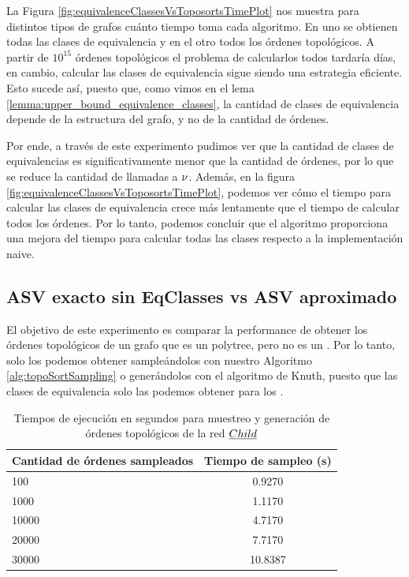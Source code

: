 La Figura \ref{fig:equivalenceClassesVsToposortsTimePlot} nos muestra para distintos tipos de grafos cuánto tiempo toma cada algoritmo. En uno se obtienen todas las clases de equivalencia y en el otro todos los órdenes topológicos. A partir de $10^{15}$ órdenes topológicos el problema de calcularlos todos tardaría días, en cambio, calcular las clases de equivalencia sigue siendo una estrategia eficiente. Esto sucede así, puesto que, como vimos en el lema \ref{lemma:upper_bound_equivalence_classes}, la cantidad de clases de equivalencia depende de la estructura del grafo, y no de la cantidad de órdenes.

Por ende, a través de este experimento pudimos ver que la cantidad de clases de equivalencias es significativamente menor que la cantidad de órdenes, por lo que se reduce la cantidad de llamadas a $\nu$. Además, en la figura \ref{fig:equivalenceClassesVsToposortsTimePlot}, podemos ver cómo el tiempo para calcular las clases de equivalencia crece más lentamente que el tiempo de calcular todos los órdenes. Por lo tanto, podemos concluir que el algoritmo proporciona una mejora del tiempo para calcular todas las clases respecto a la implementación naive.

\subsection{ASV exacto sin EqClasses vs ASV aproximado}

El objetivo de este experimento es comparar la performance de obtener los órdenes topológicos de un grafo que es un polytree, pero no es un \dtree. Por lo tanto, solo los podemos obtener sampleándolos con nuestro Algoritmo \ref{alg:topoSortSampling} o generándolos con el algoritmo de Knuth, puesto que las clases de equivalencia solo las podemos obtener para los \dtrees.

\begin{table}[h]
	\centering
	\begin{tabular}{|l|c|}
		\hline
		\textbf{Cantidad de órdenes sampleados} & \textbf{Tiempo de sampleo (s)}\\
		\hline
		100 & 0.9270 \\
		1000 & 1.1170 \\
		10000 & 4.7170 \\
		20000 & 7.7170 \\
		30000 & 10.8387 \\
		\hline
	\end{tabular}
	
	\caption{Tiempos de ejecución en segundos para muestreo y generación de órdenes topológicos de la red $\emph{Child}$}
	\label{table:exactVsApproximateTopoSorts}
\end{table}

